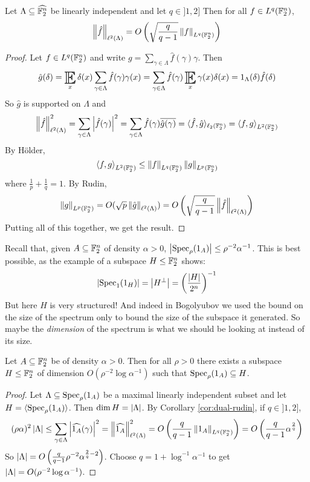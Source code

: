 \documentclass{article}
\begin{document}
\begin{ncor}\label{cor:dual-rudin}
  Let $\Lambda \subseteq \widehat{\mathbb F_2^n}$ be linearly independent and let $q \in ]1, 2]$ Then for all $f \in L^q(\mathbb F_2^n)$,
  $$\left\lVert \hat f\right\rVert_{\ell^2(\Lambda)} = O\left(\sqrt{\frac q{q - 1}} \left\lVert f\right\rVert_{L^q(\mathbb F_2^n)}\right)$$
\end{ncor}
\begin{proof}
  Let $f \in L^q(\mathbb F_2^n)$ and write $g = \sum_{\gamma \in \Lambda} \hat f(\gamma)\gamma$. Then
  $$\hat g(\delta) = \E_x \delta(x) \sum_{\gamma \in \Lambda} \hat f(\gamma) \gamma(x) = \sum_{\gamma \in \Lambda} \hat f(\gamma) \E_x \gamma(x)\delta(x) = 1_\Lambda(\delta) \hat f(\delta)$$
  So $\hat g$ is supported on $\Lambda$ and
  $$\left\lVert \hat f\right\rVert_{\ell^2(\Lambda)}^2 = \sum_{\gamma \in \Lambda} \left\lvert \hat f(\gamma)\right\rvert^2 = \sum_{\gamma \in \Lambda} \hat f(\gamma)\overline{\hat g(\gamma)} = \langle\hat f, \hat g\rangle_{\ell_2(\mathbb F_2^n)} = \left\langle f, g\right\rangle_{L^2(\mathbb F_2^n)}$$
  By Hölder,
  $$\left\langle f, g\right\rangle_{L^2(\mathbb F_2^n)} \le \left\lVert f\right\rVert_{L^q(\mathbb F_2^n)}\left\lVert g\right\rVert_{L^p(\mathbb F_2^n)}$$
  where $\frac 1p + \frac 1q = 1$. By Rudin,
  $$\left\lVert g\right\rVert_{L^p(\mathbb F_2^n)} = O(\sqrt p \left\lVert \hat g\right\rVert_{\ell^2(\Lambda)}) = O\left(\sqrt{\frac q{q - 1}} \left\lVert \hat f\right\rVert_{\ell^2(\Lambda)}\right)$$
  Putting all of this together, we get the result.
\end{proof}

Recall that, given $A \subseteq \mathbb F_2^n$ of density $\alpha > 0$, $\left\lvert \operatorname{Spec}_\rho(1_A)\right\rvert \le \rho^{-2}\alpha^{-1}$. This is best possible, as the example of a subspace $H \le \mathbb F_2^n$ shows:
$$\left\lvert \operatorname{Spec}_1(1_H)\right\rvert = \left\lvert H^\perp\right\rvert = \left(\frac{\left\lvert H\right\rvert}{2^n}\right)^{-1}$$
But here $H$ is very structured! And indeed in Bogolyubov we used the bound on the size of the spectrum only to bound the size of the subspace it generated. So maybe the {\it dimension} of the spectrum is what we should be looking at instead of its size.

\begin{nthm}
  Let $A \subseteq \mathbb F_2^n$ be of density $\alpha > 0$. Then for all $\rho > 0$ there exists a subspace $H \le \mathbb F_2^n$ of dimension $O(\rho^{-2}\log\alpha^{-1})$ such that $\operatorname{Spec}_\rho(1_A) \subseteq H$.
\end{nthm}
\begin{proof}
  Let $\Lambda \subseteq \operatorname{Spec}_\rho(1_A)$ be a maximal linearly independent subset and let $H = \langle\operatorname{Spec}_\rho(1_A)\rangle$. Then $\dim H = \left\lvert \Lambda\right\rvert$. By Corollary \ref{cor:dual-rudin}, if $q \in ]1, 2]$,
  $$(\rho\alpha)^2\left\lvert \Lambda\right\rvert \le \sum_{\gamma \in \Lambda} \left\lvert \widehat{1_A}(\gamma)\right\rvert^2 = \left\lVert \widehat{1_A}\right\rVert_{\ell^2(\Lambda)}^2 = O\left(\frac q{q - 1}\left\lVert 1_A\right\rVert_{L^q(\mathbb F_2^n)}\right) = O\left(\frac q{q - 1} \alpha^{\frac 2q}\right)$$
  So $\left\lvert \Lambda\right\rvert = O\left(\frac q{q - 1}\rho^{-2}\alpha^{\frac 2q - 2}\right)$. Choose $q = 1 + \log^{-1} \alpha^{-1}$ to get $\left\lvert \Lambda\right\rvert = O(\rho^{-2}\log\alpha^{-1})$.
\end{proof}
\end{document}
